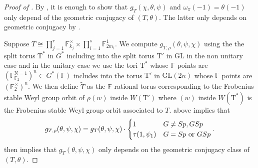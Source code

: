 \documentclass[12pt, reqno]{amsart}
\theoremstyle{definition}
\theoremstyle{definition}
\theoremstyle{definition}
\newcommand{\multiplicativegroup}[1]{#1^{\times}}
\newcommand{\GL}{\mathrm{GL}}
\newcommand{\aFieldNorm}{\mathrm{N}}
\newcommand{\finiteField}{\mathbb{F}}
\newcommand{\finiteFieldExtension}[1]{\finiteField_{#1}}
\newcommand{\NormOneGroup}[1]{\finiteFieldExtension{#1}^{\aFieldNorm = 1}}
\newcommand{\algebraicGroup}[1]{\boldsymbol{\mathrm{#1}}}
\begin{document}
\begin{proof}[Proof of ] 
By , it is enough to show that $g_{T}(\chi,\theta,\psi)$ and $\omega_{\pi}(-1) = \theta(-1)$ only depend of the geometric conjugacy of $(T,\theta)$. The latter only depends on geometric conjugacy by .

Suppose $T \cong \prod_{j=1}^r \multiplicativegroup{\finiteFieldExtension{k_j}} \times \prod_{i=1}^s \finiteFieldExtension{2m_i}^1$. We compute $g_{T,\rho}(\theta,\psi,\chi)$ using the the split torus $\algebraicGroup{T}^*$ in $G^*$ including into the split torus $\algebraicGroup{T}'$ in $\GL$ in the non unitary case and in the unitary case we use the tori $\algebraicGroup{T}^*$ whose $\finiteField$ points are $(\NormOneGroup{\finiteFieldExtension{2}})^n \subset G^*(\finiteField)$ includes into the torus $\algebraicGroup{T}'$ in $\GL(2n)$ whose $\finiteField$ points are $(\finiteFieldExtension{2}^\times)^n$. We then define $\tilde{T}$ as the $\finiteField$-rational torus corresponding to the Frobenius stable Weyl group orbit of $\rho(w)$ inside $W(\algebraicGroup{T}')$ where $(w)$ inside $W(\algebraicGroup{T}^*)$ is the Frobenius stable Weyl group orbit associated to $T$.  above implies that
\[
g_{T,\rho}(\theta,\psi,\chi)= g_{T}(\theta,\psi,\chi) \cdot \begin{cases}
        1  & G \neq Sp, GSp\\
        \tau(1,\psi_1) & G = Sp \textnormal{ or } GSp
    \end{cases}.
\]
 then implies that $g_T(\theta,\psi,\chi)$ only depends on the geometric conjugacy class of $(T,\theta)$.   
\begin{comment}
We will have to treat the unitary group case seperatedly. First for the non-unitary group case:\\




\end{comment}
\end{proof}
\end{document}
